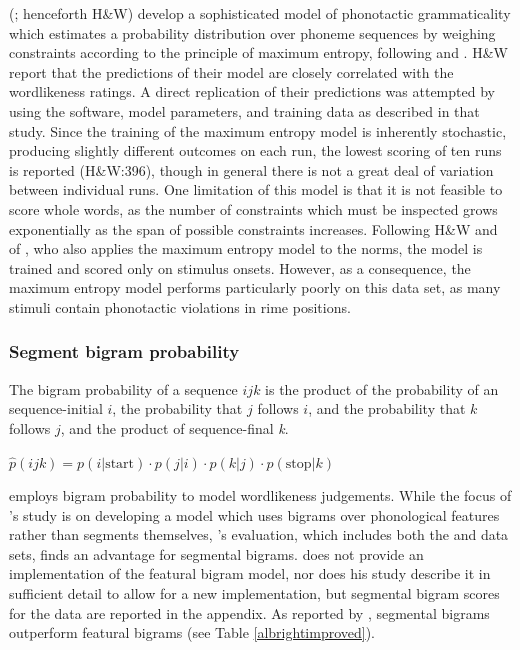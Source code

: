 \citeauthor{Hayes2008a} (\citeyear{Hayes2008a}; henceforth H\&W) develop a sophisticated model of phonotactic grammaticality which estimates a probability distribution over phoneme sequences by weighing constraints according to the principle of maximum entropy, following \citet{Goldwater2003} and \citet{Jager2007}. H\&W report that the predictions of their model are closely correlated with the \citet{Scholes1966} wordlikeness ratings. A direct replication of their predictions was attempted by using the software, model parameters, and training data as described in that study. Since the training of the maximum entropy model is inherently stochastic, producing slightly different outcomes on each run, the lowest scoring of ten runs is reported (H\&W:396), though in general there is not a great deal of variation between individual runs. One limitation of this model is that it is not feasible to score whole words, as the number of constraints which must be inspected grows exponentially as the span of possible constraints increases. Following H\&W and of \citet{Albright2009a}, who also applies the maximum entropy model to the \citet{Albright2003b} norms, the model is trained and scored only on stimulus onsets. However, as a consequence, the maximum entropy model performs particularly poorly on this data set, as many stimuli contain phonotactic violations in rime positions.

\subsubsection{Segment bigram probability} \label{bigram}

The bigram probability of a sequence $ijk$ is the product of the probability of an sequence-initial $i$, the probability that $j$ follows $i$, and the probability that $k$ follows $j$, and the product of sequence-final \emph{k}.

\begin{unlabeledexample}
$\displaystyle \hat{p}(ijk) = p(i|\textrm{start}) \cdot p(j|i) \cdot p(k|j) \cdot p(\textrm{stop}|k)$
\end{unlabeledexample}

\noindent \citet{Albright2009a} employs bigram probability to model wordlikeness judgements. While the focus of \citeauthor{Albright2009a}'s study is on developing a model which uses bigrams over phonological features rather than segments themselves, \citeauthor{Albright2009a}'s evaluation, which includes both the \citeauthor{Scholes1966} and \citeauthor{Albright2003b} data sets, finds an advantage for segmental bigrams. \citeauthor{Albright2009a} does not provide an implementation of the featural bigram model, nor does his study describe it in sufficient detail to allow for a new implementation, but segmental bigram scores for the \citeauthor{Albright2003a} data are reported in the appendix. As reported by \citeauthor{Albright2009a}, segmental bigrams outperform featural bigrams (see Table \ref{albrightimproved}).

